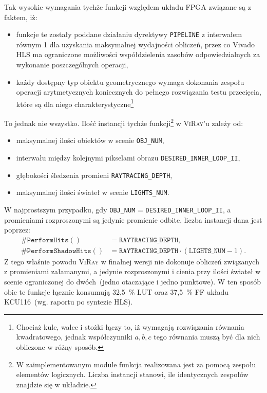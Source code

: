 \begin{enumerate}
Tak wysokie wymagania tychże funkcji względem układu FPGA związane są z faktem, iż:
\begin{itemize}
\item funkcje te zostały poddane działaniu dyrektywy \texttt{PIPELINE} z interwałem równym 1 dla uzyskania maksymalnej wydajności obliczeń, przez co Vivado HLS ma ograniczone możliwości współdzielenia zasobów odpowiedzialnych za wykonanie poszczególnych operacji,
\item każdy dostępny typ obiektu geometrycznego wymaga dokonania zespołu operacji arytmetycznych koniecznych do pełnego rozwiązania testu przecięcia, które są dla niego charakterystyczne\footnote{Chociaż kule, walce i stożki łączy to, iż wymagają rozwiązania równania kwadratowego, jednak współczynniki $a, b, c$ tego równania muszą być dla nich obliczone w różny sposób.}
\end{itemize}
To jednak nie wszystko. Ilość instancji tychże funkcji\footnote{W zaimplementowanym module funkcja realizowana jest za pomocą zespołu elementów logicznych. Liczba instancji stanowi, ile identycznych zespołów znajdzie się w układzie.} w \textsc{ViRay}'u zależy od:
\begin{itemize}
\item maksymalnej ilości obiektów w scenie \texttt{OBJ\_NUM},
\item interwału między kolejnymi pikselami obrazu \texttt{DESIRED\_INNER\_LOOP\_II},
\item głębokości śledzenia promieni \texttt{RAYTRACING\_DEPTH},
\item maksymalnej ilości świateł w scenie \texttt{LIGHTS\_NUM}.
\end{itemize}
W najprostszym przypadku, gdy \texttt{OBJ\_NUM} = \texttt{DESIRED\_INNER\_LOOP\_II}, a promieniami rozproszonymi są jedynie promienie odbite, liczba instancji dana jest poprzez:
\begin{align*}
\#\mathtt{PerformHits()} &= \mathtt{RAYTRACING\_DEPTH},\\
\#\mathtt{PerformShadowHits()} &= \mathtt{RAYTRACING\_DEPTH} \cdot \left(\mathtt{LIGHTS\_NUM} - 1\right).
\end{align*}
Z tego właśnie powodu \textsc{ViRay} w finalnej wersji nie dokonuje obliczeń związanych z promieniami załamanymi, a jedynie rozproszonymi i cienia przy ilości świateł w scenie ograniczonej do dwóch~(jedno otaczające i jedno punktowe). W ten sposób obie te funkcje łącznie konsumują 32,5~\% LUT oraz 37,5~\% FF układu KCU116~(wg. raportu po syntezie HLS). 


\end{enumerate}
